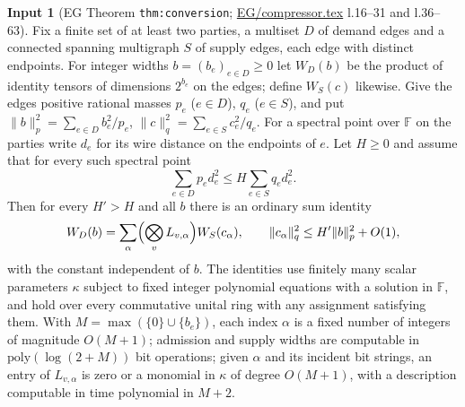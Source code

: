\documentclass[11pt]{article}
\theoremstyle{definition}
\newtheorem{hyp}{Input}
\theoremstyle{remark}
\newcommand{\F}{\mathbb F}
\newcommand{\src}[1]{\url{#1}}
\begin{document}
\begin{hyp}[EG Theorem \texttt{thm:conversion}; \src{EG/compressor.tex} l.16--31 and l.36--63]\label{H6}
Fix a finite set of at least two parties, a multiset $D$ of demand edges and a connected spanning multigraph $S$ of supply edges,
each edge with distinct endpoints. For integer widths $b=(b_e)_{e\in D}\ge0$ let $W_D(b)$ be the product of identity tensors of
dimensions $2^{b_e}$ on the edges; define $W_S(c)$ likewise. Give the edges positive rational masses $p_e$ ($e\in D$), $q_e$
($e\in S$), and put $\|b\|_p^2=\sum_{e\in D}b_e^2/p_e$, $\|c\|_q^2=\sum_{e\in S}c_e^2/q_e$. For a spectral point over $\F$ on the
parties write $d_e$ for its wire distance on the endpoints of $e$. Let $H\ge0$ and assume that for every such spectral point
\[
 \textstyle\sum_{e\in D}p_ed_e^2\le H\sum_{e\in S}q_ed_e^2 .
\]
Then for every $H'>H$ and all $b$ there is an ordinary sum identity
\[
 W_D(b)=\sum_\alpha\Bigl(\bigotimes_vL_{v,\alpha}\Bigr)W_S(c_\alpha),\qquad \|c_\alpha\|_q^2\le H'\|b\|_p^2+O(1),
\]
with the constant independent of $b$. The identities use finitely many scalar parameters $\kappa$ subject to fixed integer
polynomial equations with a solution in $\F$, and hold over every commutative unital ring with any assignment satisfying them.
With $M=\max(\{0\}\cup\{b_e\})$, each index $\alpha$ is a fixed number of integers of magnitude $O(M+1)$; admission and supply
widths are computable in $\mathrm{poly}(\log(2+M))$ bit operations; given $\alpha$ and its incident bit strings, an entry of
$L_{v,\alpha}$ is zero or a monomial in $\kappa$ of degree $O(M+1)$, with a description computable in time polynomial in $M+2$.
\end{hyp}
\end{document}
